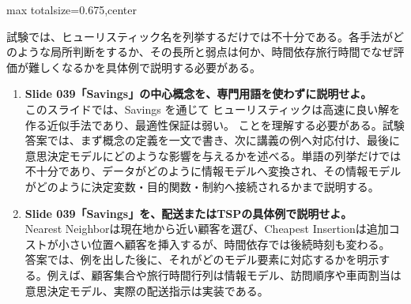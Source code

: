 \begin{adjustbox}{max totalsize={\textwidth}{0.675\textheight},center}
\begin{minipage}{\textwidth}
\begin{minipage}[t]{0.485\textwidth}
試験では、ヒューリスティック名を列挙するだけでは不十分である。各手法がどのような局所判断をするか、その長所と弱点は何か、時間依存旅行時間でなぜ評価が難しくなるかを具体例で説明する必要がある。\par
{}
\begin{enumerate}
\item \textbf{Slide 039「Savings」の中心概念を、専門用語を使わずに説明せよ。}\\このスライドでは、Savings を通じて ヒューリスティックは高速に良い解を作る近似手法であり、最適性保証は弱い。 ことを理解する必要がある。試験答案では、まず概念の定義を一文で書き、次に講義の例へ対応付け、最後に意思決定モデルにどのような影響を与えるかを述べる。単語の列挙だけでは不十分であり、データがどのように情報モデルへ変換され、その情報モデルがどのように決定変数・目的関数・制約へ接続されるかまで説明する。
\item \textbf{Slide 039「Savings」を、配送またはTSPの具体例で説明せよ。}\\Nearest Neighborは現在地から近い顧客を選び、Cheapest Insertionは追加コストが小さい位置へ顧客を挿入するが、時間依存では後続時刻も変わる。 答案では、例を出した後に、それがどのモデル要素に対応するかを明示する。例えば、顧客集合や旅行時間行列は情報モデル、訪問順序や車両割当は意思決定モデル、実際の配送指示は実装である。
\end{enumerate}
\end{minipage}
\end{minipage}
\end{adjustbox}

